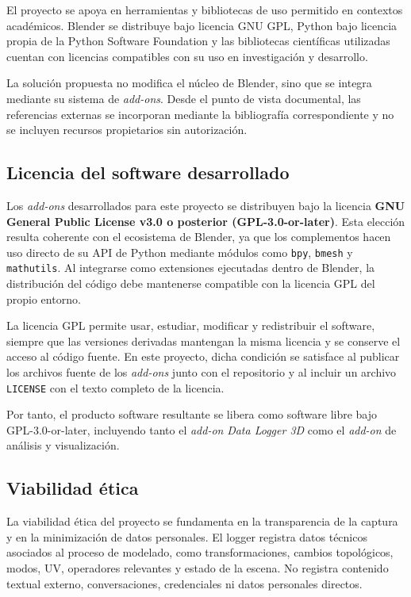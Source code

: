 El proyecto se apoya en herramientas y bibliotecas de uso permitido en contextos académicos. Blender se distribuye bajo licencia GNU GPL, Python bajo licencia propia de la Python Software Foundation y las bibliotecas científicas utilizadas cuentan con licencias compatibles con su uso en investigación y desarrollo.

La solución propuesta no modifica el núcleo de Blender, sino que se integra mediante su sistema de \textit{add-ons}. Desde el punto de vista documental, las referencias externas se incorporan mediante la bibliografía correspondiente y no se incluyen recursos propietarios sin autorización.

\subsection{Licencia del software desarrollado}
\label{subsec:licencia-software}

Los \textit{add-ons} desarrollados para este proyecto se distribuyen bajo la licencia \textbf{GNU General Public License v3.0 o posterior (GPL-3.0-or-later)}. Esta elección resulta coherente con el ecosistema de Blender, ya que los complementos hacen uso directo de su API de Python mediante módulos como \texttt{bpy}, \texttt{bmesh} y \texttt{mathutils}. Al integrarse como extensiones ejecutadas dentro de Blender, la distribución del código debe mantenerse compatible con la licencia GPL del propio entorno.

La licencia GPL permite usar, estudiar, modificar y redistribuir el software, siempre que las versiones derivadas mantengan la misma licencia y se conserve el acceso al código fuente. En este proyecto, dicha condición se satisface al publicar los archivos fuente de los \textit{add-ons} junto con el repositorio y al incluir un archivo \texttt{LICENSE} con el texto completo de la licencia.

Por tanto, el producto software resultante se libera como software libre bajo GPL-3.0-or-later, incluyendo tanto el \textit{add-on} \textit{Data Logger 3D} como el \textit{add-on} de análisis y visualización.

\subsection{Viabilidad ética}
\label{subsec:a-viabilidad-etica}

La viabilidad ética del proyecto se fundamenta en la transparencia de la captura y en la minimización de datos personales. El logger registra datos técnicos asociados al proceso de modelado, como transformaciones, cambios topológicos, modos, UV, operadores relevantes y estado de la escena. No registra contenido textual externo, conversaciones, credenciales ni datos personales directos.

